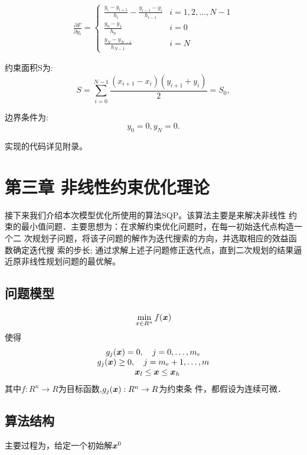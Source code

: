 \documentclass[12pt,oneside,a4paper]{article}
\begin{document}
\begin{align*}
\frac{\partial F}{\partial y_i} = \left\{\begin{array}{ll}
\frac{y_{i}-y_{i+1}}{h_{i}} - \frac{y_{i-1}-y_{i}}{h_{i-1}} & i=1,2,\ldots,N-1 \\
\frac{y_0-y_1}{h_0} & i=0 \\
\frac{y_N-y_{N-1}}{h_{N-1}} & i=N
\end{array}\right.
\end{align*}

约束面积S为:
\begin{equation*}
S=\sum_{i=0}^{N-1}\dfrac{(x_{i+1}-x_{i})(y_{i+1}+y_{i})}{2}=S_{0},
\end{equation*}

边界条件为:
\begin{equation*}
y_{0}=0,y_{N}=0.
\end{equation*}

实现的代码详见附录。

\newpage
\mbox{}
\newpage

\section{第三章 非线性约束优化理论}
接下来我们介绍本次模型优化所使用的算法SQP\cite{kraft}。该算法主要是来解决非线性
约束的最小值问题．主要思想为：在求解约束优化问题时，在每一初始迭代点构造一个二
次规划子问题，将该子问题的解作为迭代搜索的方向，并选取相应的效益函数确定迭代搜
索的步长; 通过求解上述子问题修正迭代点，直到二次规划的结果逼近原非线性规划问题的最优解。

\subsection{问题模型}
\begin{equation}\label{iq}
\min _{x \in R^{n}} f({\boldsymbol x})
\end{equation}
使得
\begin{equation*}
\begin{array}{c}
g_{j}({\boldsymbol x})=0, \quad j=0, \ldots, m_{e} \\
g_{j}({\boldsymbol x}) \geq 0, \quad j=m_{e}+1, \ldots, m \\
\quad {\boldsymbol x}_{l} \leq {\boldsymbol x} \leq {\boldsymbol x}_{h}
\end{array}
\end{equation*}
其中$f: R^{n} \rightarrow R$为目标函数,$ g_j({\boldsymbol x}):R^{n} \rightarrow R$为约束条
件，都假设为连续可微．

\subsection{算法结构}
主要过程为，给定一个初始解${\boldsymbol x}^0$
\end{document}
